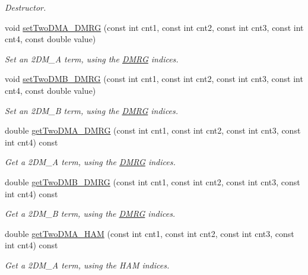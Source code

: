 \begin{DoxyCompactItemize}
\begin{DoxyCompactList}\small\item\em Destructor. \end{DoxyCompactList}\item 
void \hyperlink{classCheMPS2_1_1TwoDM_a6f573db9c2f0225b00c2e2a7bc54cb11}{set\-Two\-D\-M\-A\-\_\-\-D\-M\-R\-G} (const int cnt1, const int cnt2, const int cnt3, const int cnt4, const double value)
\begin{DoxyCompactList}\small\item\em Set an 2\-D\-M\-\_\-\-A term, using the \hyperlink{classCheMPS2_1_1DMRG}{D\-M\-R\-G} indices. \end{DoxyCompactList}\item 
void \hyperlink{classCheMPS2_1_1TwoDM_a45b8653b912b36327e8ef7877707e0d2}{set\-Two\-D\-M\-B\-\_\-\-D\-M\-R\-G} (const int cnt1, const int cnt2, const int cnt3, const int cnt4, const double value)
\begin{DoxyCompactList}\small\item\em Set an 2\-D\-M\-\_\-\-B term, using the \hyperlink{classCheMPS2_1_1DMRG}{D\-M\-R\-G} indices. \end{DoxyCompactList}\item 
double \hyperlink{classCheMPS2_1_1TwoDM_a2cb905399d199f45e7101e3927933005}{get\-Two\-D\-M\-A\-\_\-\-D\-M\-R\-G} (const int cnt1, const int cnt2, const int cnt3, const int cnt4) const 
\begin{DoxyCompactList}\small\item\em Get a 2\-D\-M\-\_\-\-A term, using the \hyperlink{classCheMPS2_1_1DMRG}{D\-M\-R\-G} indices. \end{DoxyCompactList}\item 
double \hyperlink{classCheMPS2_1_1TwoDM_ad7615a0d2458408de29de4b8b88868f1}{get\-Two\-D\-M\-B\-\_\-\-D\-M\-R\-G} (const int cnt1, const int cnt2, const int cnt3, const int cnt4) const 
\begin{DoxyCompactList}\small\item\em Get a 2\-D\-M\-\_\-\-B term, using the \hyperlink{classCheMPS2_1_1DMRG}{D\-M\-R\-G} indices. \end{DoxyCompactList}\item 
double \hyperlink{classCheMPS2_1_1TwoDM_a40c2181006aaf66b8dad2e545e3d8186}{get\-Two\-D\-M\-A\-\_\-\-H\-A\-M} (const int cnt1, const int cnt2, const int cnt3, const int cnt4) const 
\begin{DoxyCompactList}\small\item\em Get a 2\-D\-M\-\_\-\-A term, using the H\-A\-M indices. \end{DoxyCompactList}\item 

\end{DoxyCompactItemize}
